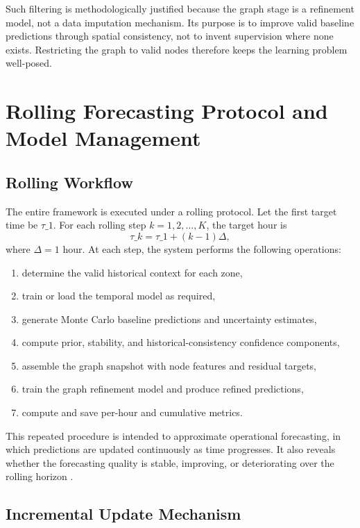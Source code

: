 \documentclass[12pt,a4paper]{report}
\begin{document}
Such filtering is methodologically justified because the graph stage is a refinement model, not a data imputation mechanism. Its purpose is to improve valid baseline predictions through spatial consistency, not to invent supervision where none exists. Restricting the graph to valid nodes therefore keeps the learning problem well-posed.

\section{Rolling Forecasting Protocol and Model Management}
\label{sec:rolling-protocol}

\subsection{Rolling Workflow}

The entire framework is executed under a rolling protocol. Let the first target time be \(\tau\_1\). For each rolling step \(k = 1, 2, \dots, K\), the target hour is
\[
\tau\_k = \tau\_1 + (k-1)\Delta,
\]
where \(\Delta = 1\) hour. At each step, the system performs the following operations:
\begin{enumerate}
	\item determine the valid historical context for each zone,
	\item train or load the temporal model as required,
	\item generate Monte Carlo baseline predictions and uncertainty estimates,
\item compute prior, stability, and historical-consistency confidence components,
	\item assemble the graph snapshot with node features and residual targets,
	\item train the graph refinement model and produce refined predictions,
	\item compute and save per-hour and cumulative metrics.
\end{enumerate}

This repeated procedure is intended to approximate operational forecasting, in which predictions are updated continuously as time progresses. It also reveals whether the forecasting quality is stable, improving, or deteriorating over the rolling horizon \cite{hewamalage2022pitfalls,cerqueira2020evaluating}.

\subsection{Incremental Update Mechanism}
\end{document}
